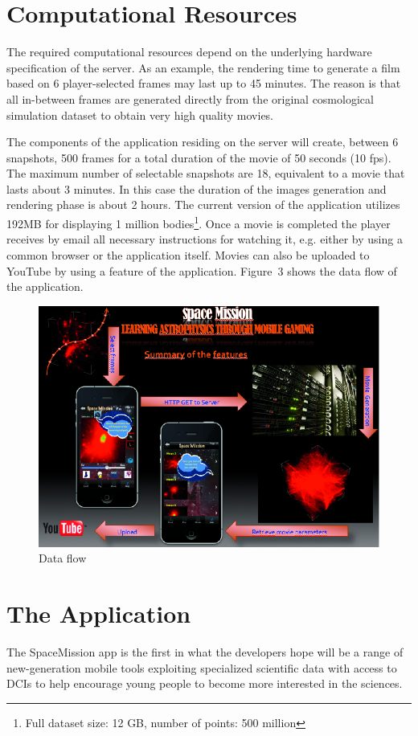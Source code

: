 \section{Computational Resources}
The required computational resources depend on the underlying hardware specification of the server. As an example, the rendering time to generate a film based on 6 player-selected frames may last up to 45 minutes. The reason is that all in-between frames are generated directly from the original cosmological simulation dataset to obtain very high quality movies.

The components of the application residing on the server will  create, between  6 snapshots, 500 frames for a total duration of the movie of 50 seconds  (10 fps). The maximum number of selectable snapshots are 18, equivalent  to a movie that lasts about 3 minutes. In this case the duration of the images generation and rendering phase is about  2 hours. The current version of the application utilizes 192MB for displaying 1 million bodies\footnote{Full dataset size: 12 GB, number of points: 500 million}. Once a movie is completed the player receives by email all necessary instructions for watching it, e.g. either by using a common browser or the application itself. Movies can also be uploaded to YouTube by using a feature of the application. Figure~3 shows the data flow of the application.

\begin{figure}[ht]
\centering
\includegraphics[scale=0.9]{part5/Massimino_O24/P024_f3}
\caption{Data flow}
\end{figure}

\section{The Application}
The SpaceMission app is the first in what the developers hope will be a range of new-generation mobile tools exploiting specialized scientific data with access to DCIs to help encourage young people to become more interested in the sciences.

